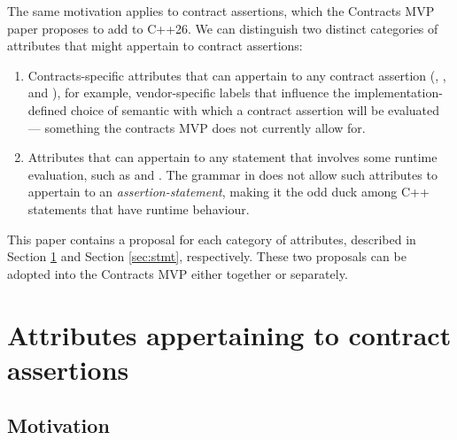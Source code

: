 The same motivation applies to contract assertions, which the Contracts MVP paper \cite{P2900R5} proposes to add to C++26. We can distinguish two distinct categories of attributes that might appertain to contract assertions:

\begin{enumerate}
\item Contracts-specific attributes that can appertain to any contract assertion (, , and ), for example, vendor-specific labels that influence the implementation-defined choice of semantic with which a contract assertion will be evaluated --- something the contracts MVP does not currently allow for.

\item Attributes that can appertain to any statement that involves some runtime evaluation, such as \tcode{[[likely]]} and \tcode{[[unlikely]]}. The grammar in \cite{P2900R5} does not allow such attributes to appertain to an \emph{assertion-statement}, making it the odd duck among C++ statements that have runtime behaviour.
\end{enumerate}

This paper contains a proposal for each category of attributes, described in Section \ref{sec:labels} and Section \ref{sec:stmt}, respectively. These two proposals can be adopted into the Contracts MVP either together or separately.


\section{Attributes appertaining to contract assertions}
\label{sec:labels}
 
 \subsection{Motivation}
 
